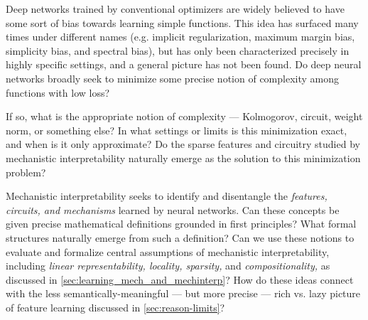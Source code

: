 \begin{opendirection}
\label{openquestion:functional-complexity}

Deep networks trained by conventional optimizers are widely believed to have some sort of bias towards learning simple functions.
This idea has surfaced many times under different names (e.g. implicit regularization, maximum margin bias, simplicity bias, and spectral bias), but has only been characterized precisely in highly specific settings, and a general picture has not been found.
Do deep neural networks broadly seek to minimize some precise notion of complexity among functions with low loss?

If so, what is the appropriate notion of complexity --- Kolmogorov, circuit, weight norm, or something else?
In what settings or limits is this minimization exact, and when is it only approximate?
Do the sparse features and circuitry studied by mechanistic interpretability naturally emerge as the solution to this minimization problem?
\end{opendirection}

\begin{opendirection}
\label{openquestion:what_are_features}

Mechanistic interpretability seeks to identify and disentangle the \textit{features, circuits, and mechanisms} learned by neural networks.
Can these concepts be given precise mathematical definitions grounded in first principles?
What formal structures naturally emerge from such a definition?
Can we use these notions to evaluate and formalize central assumptions of mechanistic interpretability, including \textit{linear representability, locality, sparsity, }and\textit{ compositionality,} as discussed in \cref{sec:learning_mech_and_mechinterp}?
How do these ideas connect with the less semantically-meaningful --- but more precise --- rich vs. lazy picture of feature learning discussed in \cref{sec:reason-limits}?
\end{opendirection}

